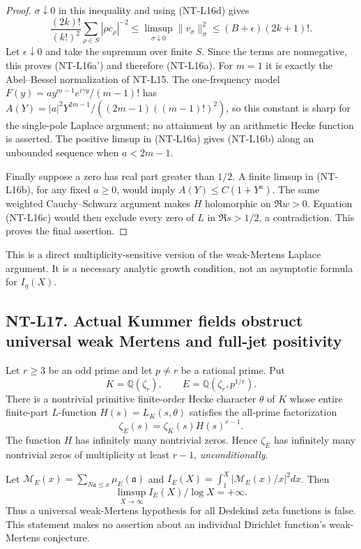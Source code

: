 \documentclass[11pt,a4paper]{article}
\begin{document}
\begin{proof}
$\sigma\downarrow0$ in this inequality and using (NT-L16d) gives
\[
 \frac{(2k)!}{(k!)^2}\sum_{\rho\in S}|\rho c_\rho|^{-2}
   \le \limsup_{\sigma\downarrow0}\|v_\sigma\|_\sigma^2
   \le (B+\epsilon)(2k+1)!.
\]
Let $\epsilon\downarrow0$ and take the supremum over finite $S$.
Since the terms are nonnegative, this proves (NT-L16a') and
therefore (NT-L16a). For $m=1$ it is exactly the Abel--Bessel
normalization of NT-L15. The one-frequency model
$F(y)=a y^{m-1}e^{i\gamma y}/(m-1)!$ has
$A(Y)=|a|^2Y^{2m-1}/((2m-1)((m-1)!)^2)$, so this constant is
sharp for the single-pole Laplace argument; no attainment by an
arithmetic Hecke function is asserted.
The positive limsup in (NT-L16a) gives (NT-L16b) along an unbounded sequence
when $a<2m-1$.

Finally suppose a zero has real part greater than $1/2$.
A finite limsup in (NT-L16b), for any fixed $a\ge0$, would imply
$A(Y)\le C(1+Y^a)$. The same weighted Cauchy--Schwarz argument
makes $H$ holomorphic on $\Re w>0$. Equation (NT-L16c) would then
exclude every zero of $L$ in $\Re s>1/2$, a contradiction.
This proves the final assertion.
\end{proof}
This is a direct multiplicity-sensitive version of the weak-Mertens
Laplace argument. It is a necessary analytic growth condition, not
an asymptotic formula for $I_\eta(X)$.

\subsection*{NT-L17. Actual Kummer fields obstruct universal weak Mertens and full-jet positivity}
Let $r\ge3$ be an odd prime and let $p\ne r$ be a rational prime. Put
\[
 K=\mathbb Q(\zeta_r),\qquad E=\mathbb Q(\zeta_r,p^{1/r}).
\]
There is a nontrivial primitive finite-order Hecke character $\theta$
of $K$ whose entire finite-part $L$-function $H(s)=L_K(s,\theta)$
satisfies the all-prime factorization
\[
                  \zeta_E(s)=\zeta_K(s)H(s)^{r-1}.     \tag{NT-L17a}
\]
The function $H$ has infinitely many nontrivial zeros. Hence $\zeta_E$
has infinitely many nontrivial zeros of multiplicity at least $r-1$,
\emph{unconditionally}.

Let $\mathcal M_E(x)=\sum_{N\mathfrak a\le x}\mu_E(\mathfrak a)$
and $I_E(X)=\int_1^X|\mathcal M_E(x)/x|^2dx$. Then
\[
            \limsup_{X\to\infty}I_E(X)/\log X=+\infty.
                                                        \tag{NT-L17b}
\]
Thus a universal weak-Mertens hypothesis for all Dedekind zeta
functions is false. This statement makes no assertion about an
individual Dirichlet function's weak-Mertens conjecture.
\end{document}
